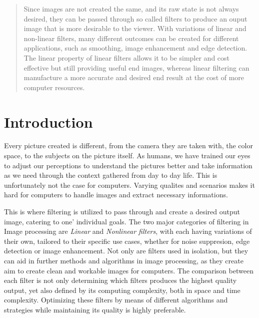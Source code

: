 \documentclass[twoside,a4paper,article]{combine}
\begin{document}


\begin{abstract}
    Since images are not created the same, and its raw state is not always desired, they can be passed through so called filters to produce an ouput image that is more
    desirable to the viewer. With variations of linear and non-linear filters, many different outcomes can be created for different applications, such as smoothing, image enhancement and edge detection.
    The linear property of linear filters allows it to be simpler and cost effective but still providing useful end images, whereas linear filtering can manufacture a more accurate and desired end result at the cost of  more computer resources.
\end{abstract}

\tableofcontents
\newpage

\section{Introduction}
Every picture created is different, from the camera they are taken with, the color space, to the subjects on the picture itself. As humans, we have trained our eyes to adjust our perceptions to
understand the pictures better and take information as we need through the context gathered from day to day life. This is unfortunately not the case for computers. Varying qualites and scenarios makes it
hard for computers to handle images and extract necessary informations.

This is where filtering is utilized to pass through and create a desired output image, catering to one' individual goals. The two major categories of filtering in Image processing are \emph{Linear} and \emph{Nonlinear filters}, with each
having variations of their own, tailored to their specific use cases, whether for noise suppresion, edge detection or image enhancement\cite{MISRA2020289}. Not only are filters used in isolation, but they can aid
in further methods and algorithms in image processing, as they create aim to create clean and workable images for computers. The comparison between each filter is not only determining which filters produces the highest quality output, yet
also defined by its computing complexity, both in space and time complexity. Optimizing these filters by means of different algorithms and strategies while maintaining its quality is highly preferable.
\end{document}
